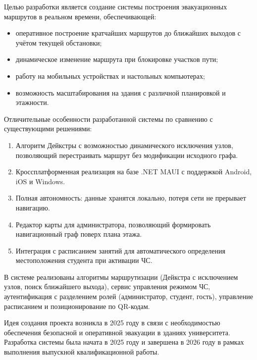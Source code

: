 Целью разработки является создание системы построения эвакуационных маршрутов в реальном времени, обеспечивающей:
\begin{itemize}
\item оперативное построение кратчайших маршрутов до ближайших выходов с учётом текущей обстановки;
\item динамическое изменение маршрута при блокировке участков пути;
\item работу на мобильных устройствах и настольных компьютерах;
\item возможность масштабирования на здания с различной планировкой и этажности.
\end{itemize}

Отличительные особенности разработанной системы по сравнению с существующими решениями:
\begin{enumerate}
\item Алгоритм Дейкстры с возможностью динамического исключения узлов, позволяющий перестраивать маршрут без модификации исходного графа.

\item Кроссплатформенная реализация на базе .NET MAUI с поддержкой Android, iOS и Windows.

\item Полная автономность: данные хранятся локально, потеря сети не прерывает навигацию.

\item Редактор карты для администратора, позволяющий формировать навигационный граф поверх плана этажа.

\item Интеграция с расписанием занятий для автоматического определения местоположения студента при активации ЧС.
\end{enumerate}

В системе реализованы алгоритмы маршрутизации (Дейкстра с исключением узлов, поиск ближайшего выхода), сервис управления режимом ЧС, аутентификация с разделением ролей (администратор, студент, гость), управление расписанием и позиционирование по QR-кодам.

Идея создания проекта возникла в 2025 году в связи с необходимостью обеспечения безопасной и оперативной эвакуации в зданиях университета. Разработка системы была начата в 2025 году и завершена в 2026 году в рамках выполнения выпускной квалификационной работы.

